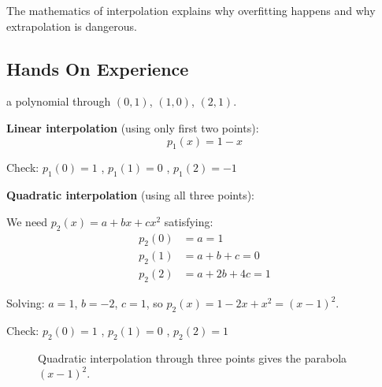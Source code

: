  The mathematics of interpolation explains why overfitting happens and why extrapolation is dangerous.



\newpage
\subsection{Hands On Experience}

 a polynomial through $(0, 1)$, $(1, 0)$, $(2, 1)$.

\vspace{1em}
\textbf{Linear interpolation} (using only first two points):
\begin{equation}
    p_1(x) = 1 - x
\end{equation}

Check: $p_1(0) = 1$ \checkmark, $p_1(1) = 0$ \checkmark, $p_1(2) = -1$ 

\vspace{1em}
\textbf{Quadratic interpolation} (using all three points):

We need $p_2(x) = a + bx + cx^2$ satisfying:
\begin{align*}
    p_2(0) &= a = 1 \\
    p_2(1) &= a + b + c = 0 \\
    p_2(2) &= a + 2b + 4c = 1
\end{align*}

Solving: $a = 1$, $b = -2$, $c = 1$, so $p_2(x) = 1 - 2x + x^2 = (x-1)^2$.


Check: $p_2(0) = 1$ \checkmark, $p_2(1) = 0$ \checkmark, $p_2(2) = 1$ \checkmark

\begin{figure}[h]
    \centering
    \caption{Quadratic interpolation through three points gives the parabola $(x-1)^2$.}
    \label{fig:quadratic_interp}
\end{figure}


